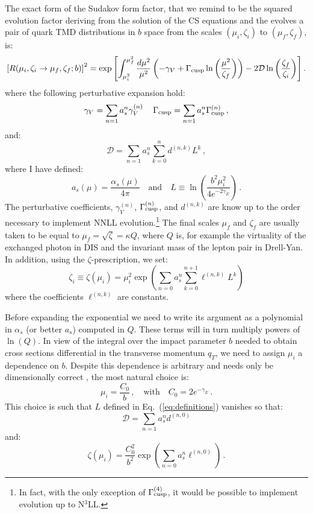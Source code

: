 \documentclass[10pt,a4paper]{article}
\begin{document}
The exact form of the Sudakov form factor, that we remind to be the
squared evolution factor deriving from the solution of the CS
equations and the evolves a pair of quark TMD distributions in $b$
space from the scales $(\mu_i,\zeta_i)$ to $(\mu_f,\zeta_f)$, is:
\begin{equation}\label{eq:sudakov}
\left[R(\mu_i,\zeta_i\rightarrow
  \mu_f,\zeta_f;b)\right]^2=\exp\left[\int_{\mu_i^2}^{\mu_f^2}\frac{d\mu^2}{\mu^2}\left(-\gamma_V+\Gamma_{\rm
    cusp}\ln\left(\frac{\mu^2}{\zeta_f}\right)\right)-2\mathcal{D}\ln\left(\frac{\zeta_f}{\zeta_i}\right)\right].
\end{equation}
where the following perturbative expansion hold:
\begin{equation}
\gamma_V = \sum_{n=1}a_s^n
\gamma_V^{(n)}\,\quad \Gamma_{\rm cusp} =
\sum_{n=1}a_s^n \Gamma_{\rm cusp}^{(n)}\,,
\end{equation}
and:
\begin{equation}
\mathcal{D} =
\sum_{n=1}a_s^{n}\sum_{k=0}^n d^{(n,k)}L^k\,,
\end{equation}
where I have defined:
\begin{equation}\label{eq:definitions}
  a_s(\mu) = \frac{\alpha_s(\mu)}{4\pi}\quad\mbox{and}\quad L\equiv \ln\left(\frac{b^2\mu_i^2}{4e^{-2\gamma_E}}\right)\,.
\end{equation}
The perturbative coefficients, $\gamma_V^{(n)}$,
$\Gamma_{\rm cusp}^{(n)}$, and $d^{(n,k)}$ are know up to the order
necessary to implement NNLL evolution.\footnote{In fact, with the only
  exception of $\Gamma_{\rm cusp}^{(4)}$, it would be possible to
  implement evolution up to N$^3$LL.} The final scales $\mu_f$ and
$\zeta_f$ are usually taken to be equal to
$\mu_f=\sqrt{\zeta}=\kappa Q$, where $Q$ is, for example the
virtuality of the exchanged photon in DIS and the invariant mass of
the lepton pair in Drell-Yan. In addition, using the
$\zeta$-prescription, we set:
\begin{equation}
\zeta_i \equiv \zeta(\mu_i) = \mu_i^2
\exp\left(\sum_{n=0}a_s^n\sum_{k=0}^{n+1}\ell^{(n,k)}L^k\right)
\end{equation}
where the coefficients $\ell^{(n,k)}$ are constants.

Before expanding the exponential we need to write its argument as a
polynomial in $\alpha_s$ (or better $a_s$) computed in $Q$. These
terms will in turn multiply powers of $\ln(Q)$. In view of the
integral over the impact parameter $b$ needed to obtain cross sections
differential in the transverse momentum $q_T$, we need to assign
$\mu_i$ a dependence on $b$. Despite this dependence is arbitrary and
needs only be dimensionally correct , the most natural choice is:
\begin{equation}
  \mu_i=\frac{C_0}{b}\,,\quad\mbox{with}\quad C_0=2e^{-\gamma_E}\,.
\end{equation}
This choice is such that $L$ defined in Eq.~(\ref{eq:definitions})
vanishes so that:
\begin{equation}
  \mathcal{D} =
  \sum_{n=1}a_s^{n}d^{(n,0)}
\end{equation}
and:
\begin{equation}
\zeta(\mu_i) =\frac{C_0^2}{b^2}
\exp\left(\sum_{n=0}a_s^n\ell^{(n,0)}\right)\,.
\end{equation}
\end{document}
